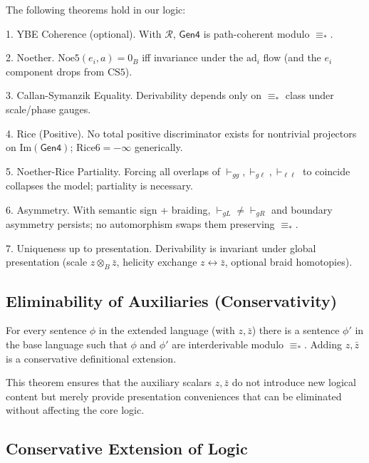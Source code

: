 \begin{theorem}
\label{thm:core-theorems}
The following theorems hold in our logic:

1. YBE Coherence (optional). With $\mathcal{R}$, $\mathsf{Gen4}$ is path-coherent modulo $\equiv_*$.

2. Noether. $\text{Noe5}(e_i,a) = 0_B$ iff invariance under the $\text{ad}_i$ flow (and the $e_i$ component drops from $\text{CS5}$).

3. Callan-Symanzik Equality. Derivability depends only on $\equiv_*$ class under scale/phase gauges.

4. Rice (Positive). No total positive discriminator exists for nontrivial projectors on $\text{Im}(\mathsf{Gen4})$; $\text{Rice6} = -\infty$ generically.

5. Noether-Rice Partiality. Forcing all overlaps of $\vdash_{gg}, \vdash_{g\ell}, \vdash_{\ell\ell}$ to coincide collapses the model; partiality is necessary.

6. Asymmetry. With semantic sign + braiding, $\vdash_{gL} \neq \vdash_{gR}$ and boundary asymmetry persists; no automorphism swaps them preserving $\equiv_*$.

7. Uniqueness up to presentation. Derivability is invariant under global presentation (scale $z \otimes_B \bar{z}$, helicity exchange $z \leftrightarrow \bar{z}$, optional braid homotopies).
\end{theorem}

\subsection{Eliminability of Auxiliaries (Conservativity)}

\begin{theorem}
\label{thm:eliminability-auxiliaries}
For every sentence $\phi$ in the extended language (with $z, \bar{z}$) there is a sentence $\phi'$ in the base language such that $\phi$ and $\phi'$ are interderivable modulo $\equiv_*$. Adding $z, \bar{z}$ is a conservative definitional extension.
\end{theorem}

This theorem ensures that the auxiliary scalars $z, \bar{z}$ do not introduce new logical content but merely provide presentation conveniences that can be eliminated without affecting the core logic.

\subsection{Conservative Extension of Logic}

